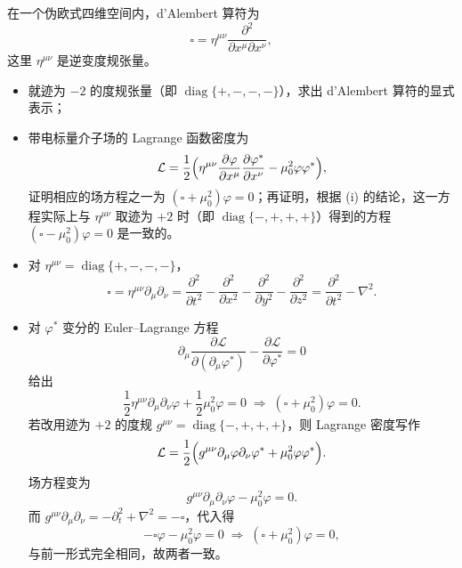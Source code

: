 \begin{question}
在一个伪欧式四维空间内，d'Alembert 算符为
\[
\square = \eta^{\mu\nu}\frac{\partial^2}{\partial x^\mu\partial x^\nu},
\]
这里 \(\eta^{\mu\nu}\) 是逆变度规张量。
\begin{itemize}
  \item[\textup{(i)}] 就迹为 \(-2\) 的度规张量（即 \(\operatorname{diag}\{+,-,-,-\}\)），求出 d'Alembert 算符的显式表示；
  \item[\textup{(ii)}] 带电标量介子场的 Lagrange 函数密度为
  \[
  \mathcal L=\frac12\Bigl(\eta^{\mu\nu}\frac{\partial\varphi}{\partial x^\mu}
  \frac{\partial\varphi^*}{\partial x^\nu}-\mu_0^2\varphi\varphi^*\Bigr),
  \]
  证明相应的场方程之一为 \((\square+\mu_0^2)\varphi=0\)；再证明，根据 (i) 的结论，这一方程实际上与 \(\eta^{\mu\nu}\) 取迹为 \(+2\) 时（即 \(\operatorname{diag}\{-,+,+,+\}\)）得到的方程 \((\square-\mu_0^2)\varphi=0\) 是一致的。
\end{itemize}
\begin{solution}
\begin{itemize}
  \item[\textup{(i)}] 对 \(\eta^{\mu\nu}=\operatorname{diag}\{+,-,-,-\}\)，
  \[
  \square = \eta^{\mu\nu}\partial_\mu\partial_\nu
  =\frac{\partial^2}{\partial t^2}-\frac{\partial^2}{\partial x^2}
  -\frac{\partial^2}{\partial y^2}-\frac{\partial^2}{\partial z^2}
  =\frac{\partial^2}{\partial t^2}-\nabla^2 .
  \]

  \item[\textup{(ii)}] 对 \(\varphi^*\) 变分的 Euler--Lagrange 方程
  \[
  \partial_\mu\frac{\partial\mathcal L}{\partial(\partial_\mu\varphi^*)}
  -\frac{\partial\mathcal L}{\partial\varphi^*}=0
  \]
  给出
  \[
  \frac12\eta^{\mu\nu}\partial_\mu\partial_\nu\varphi+\frac12\mu_0^2\varphi=0
  \;\Longrightarrow\; (\square+\mu_0^2)\varphi=0 .
  \]
  若改用迹为 \(+2\) 的度规 \(g^{\mu\nu}=\operatorname{diag}\{-,+,+,+\}\)，则 Lagrange 密度写作
  \[
  \mathcal L=\frac12\Bigl(g^{\mu\nu}\partial_\mu\varphi\partial_\nu\varphi^*
  +\mu_0^2\varphi\varphi^*\Bigr).
  \]
  场方程变为
  \[
  g^{\mu\nu}\partial_\mu\partial_\nu\varphi-\mu_0^2\varphi=0 .
  \]
  而 \(g^{\mu\nu}\partial_\mu\partial_\nu=-\partial_t^2+\nabla^2=-\square\)，代入得
  \[
  -\square\varphi-\mu_0^2\varphi=0\;\Longrightarrow\;(\square+\mu_0^2)\varphi=0,
  \]
  与前一形式完全相同，故两者一致。
\end{itemize}
\end{solution}
\end{question}

